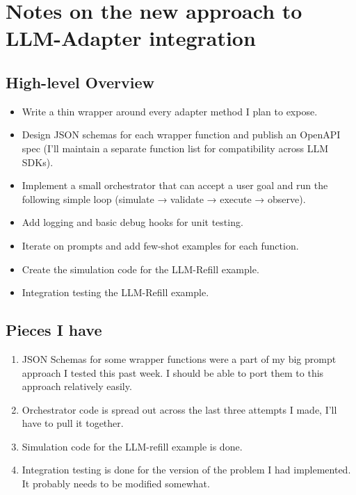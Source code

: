 \documentclass[12pt]{article}
\begin{document}
\section*{Notes on the new approach to LLM-Adapter integration}

\subsection*{High-level Overview}
\begin{itemize}[leftmargin=1.5em]
    \item Write a thin wrapper around every adapter method I plan to expose.
    \item Design JSON schemas for each wrapper function and publish an OpenAPI spec (I'll maintain a separate function list for compatibility across LLM SDKs).
    \item Implement a small orchestrator that can accept a user goal and run the following simple loop (simulate → validate → execute → observe).
    \item Add logging and basic debug hooks for unit testing.
    \item Iterate on prompts and add few-shot examples for each function.
    \item Create the simulation code for the LLM-Refill example.
    \item Integration testing the LLM-Refill example.
\end{itemize}

\subsection*{Pieces I have}
\begin{enumerate}[leftmargin=1.5em]
    \item JSON Schemas for some wrapper functions were a part of my big prompt approach I tested this past week. I should be able to port them to this approach relatively easily.
    \item Orchestrator code is spread out across the last three attempts I made, I'll have to pull it together.
    \item Simulation code for the LLM-refill example is done.
    \item Integration testing is done for the version of the problem I had implemented. It probably needs to be modified somewhat.
\end{enumerate}
\end{document}
